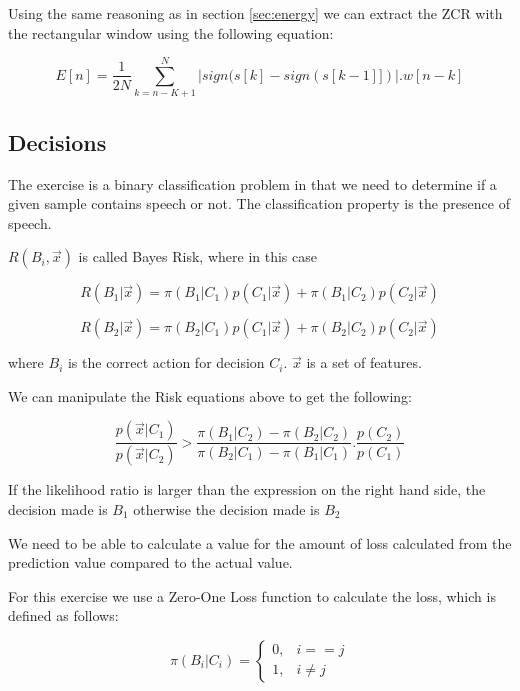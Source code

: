 \documentclass[a4paper]{article}
\begin{document}
Using the same reasoning as in section \ref{sec:energy} we can extract the
ZCR with the rectangular window using the following equation:

\begin{equation}
 E[n] = \frac{1}{2N}\sum_{k=n-K+1}^{N}|sign(s[k] - sign(s[k-1]])|.w[n-k]
\end{equation}


\subsection{Decisions}

The exercise is a binary classification problem in that we need to determine
if a given sample contains speech or not. The classification property is the 
presence of speech.

$R(B_i,\vec x)$ is called Bayes Risk, where in this case 

\begin{equation}
R(B_1|\vec x) = \pi(B_1|C_1)p(C_1|\vec x) + \pi(B_1|C_2)p(C_2|\vec x) 
\end{equation}

\begin{equation}
R(B_2|\vec x) = \pi(B_2|C_1)p(C_1|\vec x) + \pi(B_2|C_2)p(C_2|\vec x) 
\end{equation}

where $B_i$ is the correct action for decision $C_i$.
$\vec x$ is a set of features.


We can manipulate the Risk equations above to get the following:

\begin{equation}
\frac{p(\vec x|C_1)}{p(\vec x|C_2)} > \frac{\pi(B_1|C_2) - \pi(B_2|C_2)}{\pi(B_2|C_1) - \pi(B_1|C_1)}.\frac{p(C_2)}{p(C_1)} 
\end{equation}

If the likelihood ratio is larger than the expression on the right hand side, the decision made is $B_1$ otherwise
the decision made is $B_2$

We need to be able to calculate a value for the amount of loss calculated
from the prediction value compared to the actual value.

For this exercise we use a Zero-One Loss function to calculate the loss, which is defined as follows:

\begin{equation}
\pi(B_i|C_i) =  
    \begin{cases}
        0, & i == j \\
        1, & i \neq j
     \end{cases}
\end{equation}
\end{document}
